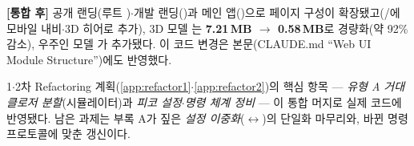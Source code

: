 \smallskip
\noindent\textbf{[통합 후]} 공개 랜딩(루트 )$\cdot$개발 랜딩()과
메인 앱()으로 페이지 구성이 확장됐고(/에
모바일 내비$\cdot$3D 히어로 추가), 3D 모델 는 \textbf{7.21\,MB $\to$ 0.58\,MB}로
경량화(약 92\% 감소), 우주인 모델 가 추가됐다. 이 코드 변경은
본문(CLAUDE.md ``Web UI Module Structure'')에도 반영했다.

\begin{infobox}[title=중간 점검 결론]
\small
1$\cdot$2차 Refactoring 계획(\ref{app:refactor1}$\cdot$\ref{app:refactor2})의 핵심
항목 --- \emph{유형 A 거대 클로저 분할}(시뮬레이터)과 \emph{피코 설정$\cdot$명령 체계
정비} --- 이 통합 머지로 실제 코드에 반영됐다. 남은 과제는 부록 A가 짚은 \emph{설정
이중화}($\leftrightarrow$)의 단일화 마무리와,
바뀐 명령 프로토콜에 맞춘  갱신이다.
\end{infobox}
